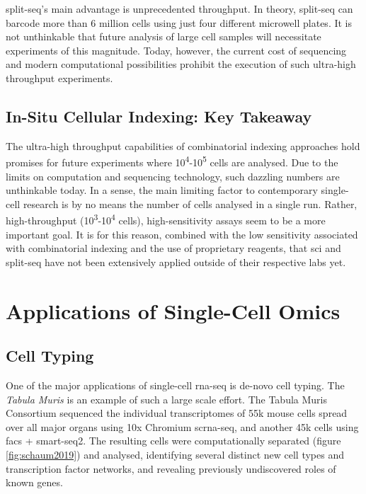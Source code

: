 \acrshort{split-seq}'s main advantage is unprecedented throughput. In theory, \acrshort{split-seq} can barcode more than 6 million cells using just four different microwell plates. It is not unthinkable that future analysis of large cell samples will necessitate experiments of this magnitude. Today, however, the current cost of sequencing and modern computational possibilities prohibit the execution of such ultra-high throughput experiments.

\newpage
\subsection{In-Situ Cellular Indexing: Key Takeaway}
The ultra-high throughput capabilities of combinatorial indexing approaches hold promises for future experiments where 10\textsuperscript{4}-10\textsuperscript{5} cells are analysed. Due to the limits on computation and sequencing technology, such dazzling numbers are unthinkable today. In a sense, the main limiting factor to contemporary single-cell research is by no means the number of cells analysed in a single run. Rather, high-throughput (10\textsuperscript{3}-10\textsuperscript{4} cells), high-sensitivity assays seem to be a more important goal. It is for this reason, combined with the low sensitivity associated with combinatorial indexing and the use of proprietary reagents, that \acrshort{sci} and \acrshort{split-seq} have not been extensively applied outside of their respective labs yet.

\section{Applications of Single-Cell Omics}

\subsection{Cell Typing}

\label{sec:lit_applications}
One of the major applications of single-cell \acrshort{rna-seq} is de-novo cell typing. The \textit{Tabula Muris} is an example of such a large scale effort. The Tabula Muris Consortium sequenced the individual transcriptomes of 55k mouse cells spread over all major organs using 10x Chromium \acrshort{scrna-seq}, and another 45k cells using \acrshort{facs} + \acrshort{smart-seq}2. The resulting cells were computationally separated (figure \ref{fig:schaum2019}) and analysed, identifying several distinct new cell types and transcription factor networks, and revealing previously undiscovered roles of known genes.\pms

